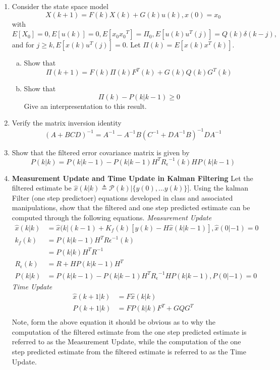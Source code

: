 \documentclass[journal,12pt,twocolumn]{IEEEtran}
\begin{document}
\begin{enumerate}
\item Consider the state space model
$$X(k+1)=F(k)X(k)+G(k)u(k),    x(0)=x_{0}$$
with $E[X_0]=0, E[u(k)]=0, E[x_{0}{x_{0}}^T]=\Pi_{0}, E[u(k)u^T(j)]=Q(k)\delta(k-j),$ and for $j \geq {k},E[x(k)u^T(j)]=0.$ 
Let $\Pi(k)=E[x(k)x^T(k)].$   
%
\begin{enumerate}[(a)]
\item Show that
$$\Pi(k+1)=F(k)\Pi(k){F^{T}(k)}+G(k)Q(k)G^T(k)$$
%
\item Show that
$$\Pi(k)-P(k\vert{k-1})\geq {0}$$
%
Give an interpresentation to this result.
\end{enumerate}
%
\item Verify the matrix inversion identity
$${(A+BCD)^{-1}}=A^{-1}-A^{-1}B{(C^{-1}+D{A^{-1}}B)}^{-1}DA^{-1}$$
%
\item Show that the filtered error covariance matrix is given by
%
$$P(k \vert k)=P(k \vert {k-1})-P(k \vert {k-1})H^T{R_\epsilon}^{-1}(k)HP(k \vert {k-1})$$
\item \textbf{Measurement Update and Time Update in Kalman Filtering}
Let the filtered estimate be ${\hat{x}(k \vert k)}\triangleq {\mathcal{P}}(k) \vert \{y(0),... y(k)\}].$ Using the kalman Filter (one step predictoer) equations developed in class and associated manipulations, show that the filtered and one step predicted estimate can be computed through the following equations.
%
\textit{Measurement Update} 
%
\begin{align*}
\hat{x}(k \vert k )& =\hat{x}(k \vert (k-1)+K_f(k)[y(k)-H\hat{x}(k\vert {k-1})], \hat{x}(0\vert {-1})=0\\
k_f(k)& =P(k\vert{k-1})H^T{R\epsilon}^{-1}(k)\\
&=P(k\vert k)H^TR^{-1}\\
R_\epsilon(k)& =R+HP(k\vert {k-1})H^T\\
P(k\vert k)& =P(k\vert {k-1})-P(k\vert{k-1})H^T{R_\epsilon}^{-1}HP(k\vert {k-1}), P(0\vert {-1})=0
\end{align*}
\textit{Time Update}
%
\begin{align*}
\hat{x}({k+1}\vert k) &=F{\hat{x}}(k \vert k)\\
P({k+1}\vert k) &=FP(k \vert k)F^T+GQG^T\\
\end{align*}
%
Note, form the above equation it should be obvious as to why the computation of the filtered estimate from the one step predicted estimate is referred to as the Measurement Update, while the computation of the one step predicted estimate from the filtered estimate is referred to as the Time Update. 
\end{enumerate}
\end{document}
